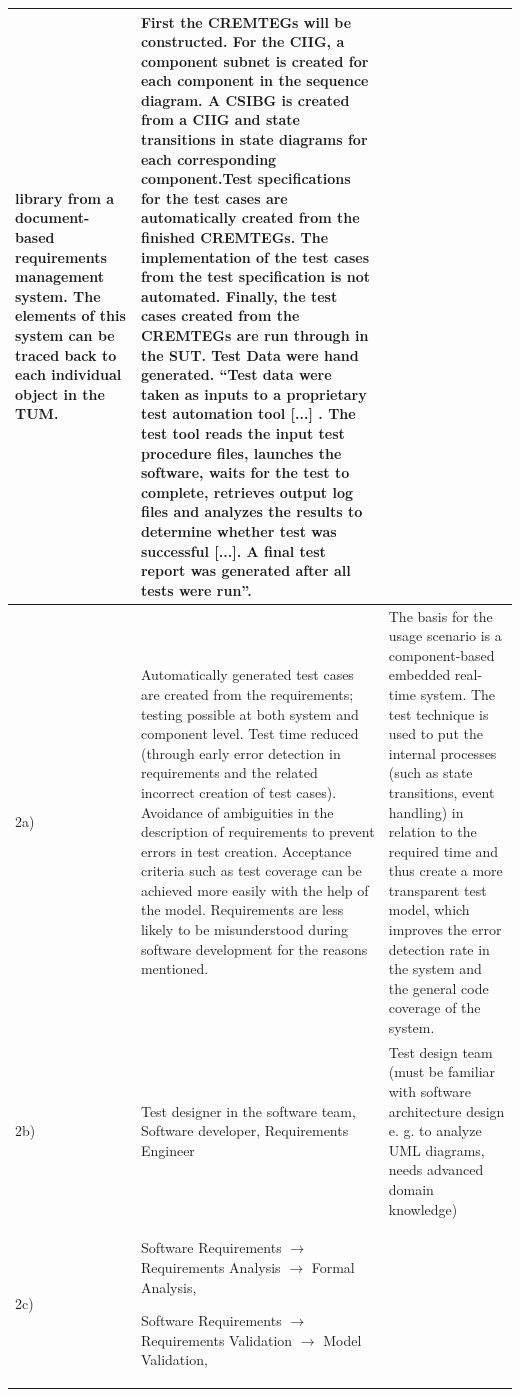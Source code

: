 \begin{small}
\begin{longtable}[h]{p{0.45cm}|p{}|p{}}
library from a document-based requirements management system. The
elements of this system can be traced back to each individual object
in the TUM.  & First the CREMTEGs will be constructed. For the CIIG, a component
subnet is created for each component in the sequence diagram. A CSIBG
is created from a CIIG and state transitions in state diagrams for
each corresponding component.Test specifications for the test cases
are automatically created from the finished CREMTEGs. The implementation
of the test cases from the test specification is not automated. Finally,
the test cases created from the CREMTEGs are run through in the SUT.
Test Data were hand generated. \enquote{Test data were taken
as inputs to a proprietary test automation tool {[}...{]} . The test
tool reads the input test procedure files, launches the software,
waits for the test to complete, retrieves output log files and analyzes
the results to determine whether test was successful {[}...{]}. A
final test report was generated after all tests were run}\cite{Guan2015}. \\
\hline 
2a) & Automatically generated test cases are created from the requirements;
testing possible at both system and component level. Test time reduced
(through early error detection in requirements and the related incorrect
creation of test cases). Avoidance of ambiguities in the description
of requirements to prevent errors in test creation. Acceptance criteria
such as test coverage can be achieved more easily with the help of
the model. Requirements are less likely to be misunderstood during
software development for the reasons mentioned.  & The basis for the usage scenario is a component-based embedded real-time
system. The test technique is used to put the internal processes (such
as state transitions, event handling) in relation to the required
time and thus create a more transparent test model, which improves
the error detection rate in the system and the general code coverage
of the system.\\
\hline 
2b) & Test designer in the software team, Software developer, Requirements
Engineer  & Test design team (must be familiar with software architecture design
e. g. to analyze UML diagrams, needs advanced domain knowledge)\\
\hline 

2c)  & Software Requirements $\rightarrow$ Requirements Analysis $\rightarrow$
Formal Analysis,

Software Requirements $\rightarrow$ Requirements Validation $\rightarrow$
Model Validation,


\end{longtable}
\end{small}
